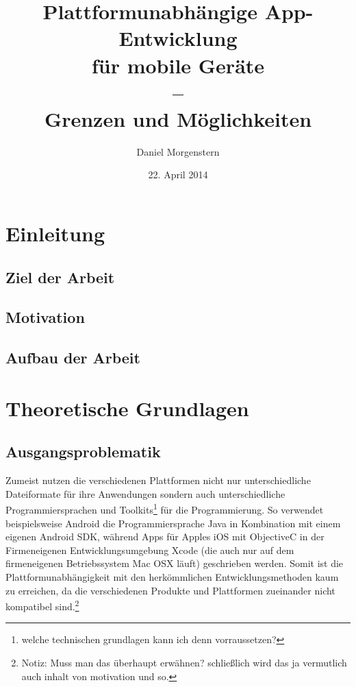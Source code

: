\documentclass{scrreprt}
\title{Plattformunabh\"angige App-Entwicklung \\ f\"ur mobile Ger\"ate \\--\\ Grenzen und M\"oglichkeiten}
\author{Daniel Morgenstern}
\date{22. April 2014}
\begin{document}
   \maketitle
   \tableofcontents
\chapter{Einleitung}
\section{Ziel der Arbeit}
\section{Motivation} %
\section{Aufbau der Arbeit} %
\chapter{Theoretische Grundlagen}

\section{Ausgangsproblematik}
Zumeist nutzen die verschiedenen Plattformen nicht nur unterschiedliche Dateiformate f\"ur ihre Anwendungen sondern auch unterschiedliche Programmiersprachen und Toolkits\footnote{welche technischen grundlagen kann ich denn vorraussetzen?} f\"ur die Programmierung. So verwendet beispielsweise Android die Programmiersprache Java in Kombination mit einem eigenen Android SDK, w\"ahrend Apps f\"ur Apples iOS mit ObjectiveC in der Firmeneigenen Entwicklungsumgebung Xcode (die auch nur auf dem firmeneigenen Betriebssystem Mac OSX l\"auft) geschrieben werden. Somit ist die Plattformunabhängigkeit mit den herk\"ommlichen Entwicklungsmethoden kaum zu erreichen, da die verschiedenen Produkte und Plattformen zueinander nicht kompatibel sind.\footnote{Notiz: Muss man das \"uberhaupt erw\"ahnen? schließlich wird das ja vermutlich auch inhalt von motivation und so.}
\end{document}

